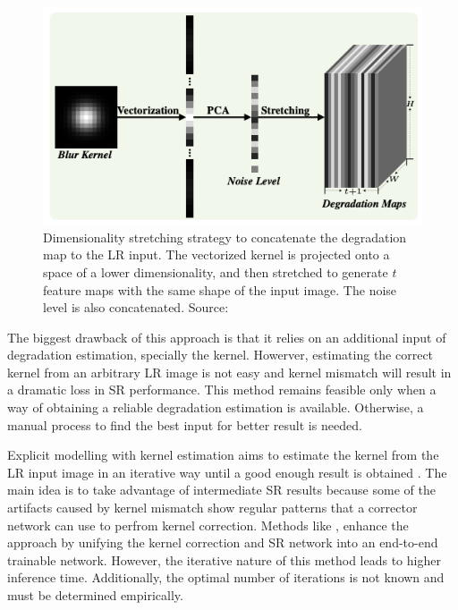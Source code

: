         \begin{figure}[H]
            \centering
            \includegraphics[width=\textwidth]{Includes/2-external-dataset-stretching.png}
            \caption{Dimensionality stretching strategy to concatenate the degradation map to the LR input. 
                     The vectorized kernel is projected onto a space of a lower dimensionality, and then stretched to generate $t$ feature maps with the same shape of the input image.
                     The noise level is also concatenated. Source: \cite{zhang2018residual} }    
            \label{fig:2-external-dataset-stretching}
        \end{figure}

        The biggest drawback  of this approach is that it relies on an additional input of degradation estimation, specially the kernel. 
        Howerver, estimating the correct kernel from an arbitrary LR image is not easy and kernel mismatch will result in a dramatic loss in SR performance.
        This method remains feasible only when a way of obtaining a reliable degradation estimation is available.
        Otherwise, a manual process to find the best input for better result is needed.
        
        Explicit modelling with kernel estimation aims to estimate the kernel from the LR input image in an iterative way until a good enough result is obtained \cite{gu2019blind}.
        The main idea is to take advantage of intermediate SR results because some of the artifacts caused by kernel mismatch show regular patterns that a corrector network can use to perfrom kernel correction.
        Methods like \cite{luo2020unfolding}, enhance the approach by unifying the kernel correction and SR network into an end-to-end trainable network. 
        However, the iterative nature of this method leads to higher inference time. Additionally, the optimal number of iterations is not known and must be determined empirically.

